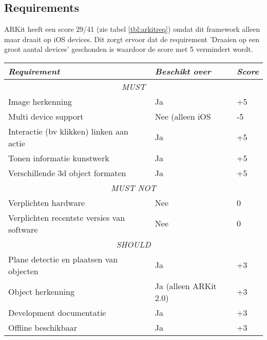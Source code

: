 \subsection{Requirements}
ARKit heeft een score 29/41 (zie tabel \ref{tbl:arkitreq}) omdat dit framework alleen maar draait op iOS devices. Dit zorgt ervoor dat de requirement 'Draaien op een groot aantal devices' geschonden is waardoor de score met 5 vermindert wordt.
\begin{table}[]
    \centering
    \begin{tabular}{@{}lll@{}}
        \toprule
        \textit{Requirement}                       & \textit{Beschikt over} & \textit{Score} \\ \midrule
        \multicolumn{3}{c}{\textit{MUST}}                                                    \\ \midrule
        Image herkenning                           & Ja                     & +5             \\
        Multi device support                       & Nee (alleen iOS        & -5             \\
        Interactie (bv klikken) linken aan actie   & Ja                     & +5             \\
        Tonen informatie kunstwerk                 & Ja                     & +5             \\
        Verschillende 3d object formaten           & Ja                     & +5             \\ \midrule
        \multicolumn{3}{c}{\textit{MUST NOT}}                                                \\ \midrule
        Verplichten hardware                       & Nee                    & 0              \\
        Verplichten recentste versies van software & Nee                    & 0              \\ \midrule
        \multicolumn{3}{c}{\textit{SHOULD}}                                                  \\ \midrule
        Plane detectie en plaatsen van objecten    & Ja                     & +3             \\
        Object herkenning                          & Ja  (alleen ARKit 2.0)                     & +3             \\
        Development documentatie                   & Ja                     & +3             \\
        Offline beschikbaar                        & Ja                     & +3             \\ \midrule

\end{tabular}
\end{table}
